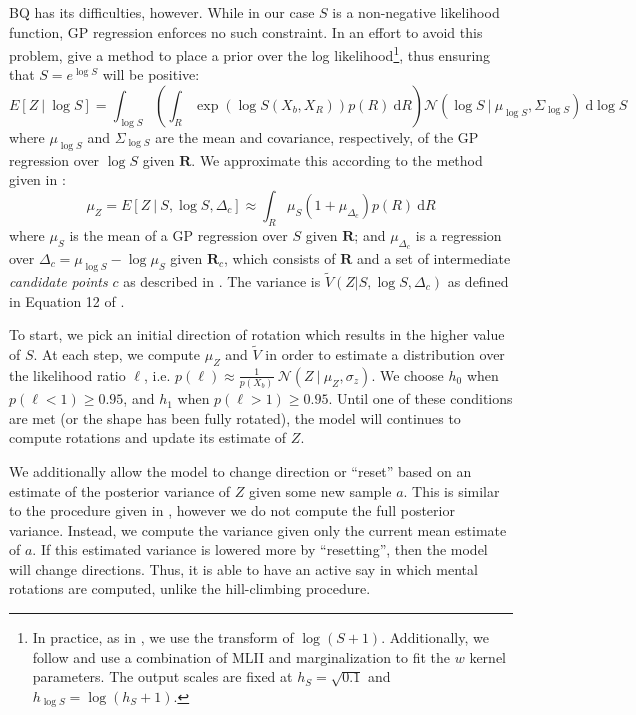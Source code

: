 \documentclass{article} %
\begin{document}
BQ has its difficulties, however. While in our case $S$ is a
non-negative likelihood function, GP regression enforces no such
constraint. In an effort to avoid this problem, \cite{Osborne:2012tm}
give a method to place a prior over the log likelihood\footnote{In
  practice, as in \cite{Osborne:2012tm}, we use the transform of
  $\log(S+1)$. Additionally, we follow \cite{Osborne:2012tm} and use a
  combination of MLII and marginalization to fit the $w$ kernel
  parameters. The output scales are fixed at $h_S=\sqrt{0.1}$ and
  $h_{\log S}=\log(h_S + 1)$.}, thus ensuring that $S=e^{\log S}$ will
be positive:
\begin{equation*}
  E[Z\ \vert \ \log S]=\int_{\log S}\left(\int_R \exp(\log{S(X_b,X_R)})p(R)\ \mathrm{d}R\right)\mathcal{N}\left(\log{S}\ \vert \ \mu_{\log S}, \Sigma_{\log S}\right)\ \mathrm{d}\log S
\end{equation*}
where $\mu_{\log S}$ and $\Sigma_{\log S}$ are the mean and
covariance, respectively, of the GP regression over $\log S$ given
$\mathbf{R}$. We approximate this according to the method given in
\cite{Osborne:2012tm}:
\begin{equation}
  \mu_Z=E[Z\ \vert \ S, \log S, \Delta_c] \approx \int_R \mu_{S}(1 + \mu_{\Delta_c}) p(R)\ \mathrm{d}R 
  \label{eq:bq-Z-mean}
\end{equation}
where $\mu_S$ is the mean of a GP regression over $S$ given
$\mathbf{R}$; and $\mu_{\Delta_c}$ is a regression over
$\Delta_c=\mu_{\log S} - \log \mu_S$ given $\mathbf{R}_c$, which
consists of $\mathbf{R}$ and a set of intermediate \emph{candidate
  points} $c$ as described in \cite{Osborne:2012tm}. The variance is
$\tilde{V}(Z\vert S, \log S, \Delta_c)$ as defined in Equation 12 of
\cite{Osborne:2012tm}.

To start, we pick an initial direction of rotation which results in
the higher value of $S$. At each step, we compute $\mu_Z$ and
$\tilde{V}$ in order to estimate a distribution over the likelihood
ratio $\ell$, i.e.  $p(\ell)\approx\frac{1}{p(X_b)}\ \mathcal{N}(Z\
\vert\ \mu_Z, \sigma_z)$.  We choose $h_0$ when $p(\ell < 1)\geq
0.95$, and $h_1$ when $p(\ell > 1)\geq 0.95$. Until one of these
conditions are met (or the shape has been fully rotated), the model
will continues to compute rotations and update its estimate of $Z$.

We additionally allow the model to change direction or ``reset'' based
on an estimate of the posterior variance of $Z$ given some new sample
$a$. This is similar to the procedure given in \cite{Osborne:2012tm},
however we do not compute the full posterior variance. Instead, we
compute the variance given only the current mean estimate of $a$. If
this estimated variance is lowered more by ``resetting'', then the
model will change directions. Thus, it is able to have an active say
in which mental rotations are computed, unlike the hill-climbing
procedure.
\end{document}
